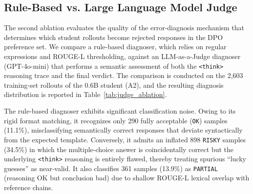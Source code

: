 \begin{table}[htbp]
\centering
\caption{Cross-Entropy Loss: LoRA vs. QLoRA on the 0.6B Student (V2 Configuration)}
\label{tab:qlora_ablation}
\end{table}

\subsection{Rule-Based vs. Large Language Model Judge}

The second ablation evaluates the quality of the error-diagnosis mechanism that determines which student rollouts become rejected responses in the DPO preference set. We compare a rule-based diagnoser, which relies on regular expressions and ROUGE-L thresholding, against an LLM-as-a-Judge diagnoser (GPT-4o-mini) that performs a semantic assessment of both the \texttt{<think>} reasoning trace and the final verdict. The comparison is conducted on the 2,603 training-set rollouts of the 0.6B student (A2), and the resulting diagnosis distribution is reported in Table~\ref{tab:judge_ablation}.

The rule-based diagnoser exhibits significant classification noise. Owing to its rigid format matching, it recognizes only 290 fully acceptable (\texttt{OK}) samples (11.1\%), misclassifying semantically correct responses that deviate syntactically from the expected template. Conversely, it admits an inflated 898 \texttt{RISKY} samples (34.5\%) in which the multiple-choice answer is coincidentally correct but the underlying \texttt{<think>} reasoning is entirely flawed, thereby treating spurious ``lucky guesses'' as near-valid. It also classifies 361 samples (13.9\%) as \texttt{PARTIAL} (reasoning OK but conclusion bad) due to shallow ROUGE-L lexical overlap with reference chains.

